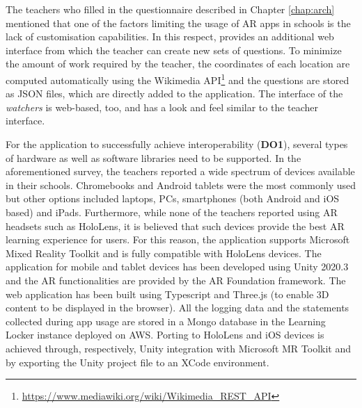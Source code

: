 The teachers who filled in the questionnaire described in Chapter \ref{chap:arch} mentioned that one of the factors limiting the usage of AR apps in schools is the lack of customisation capabilities.
In this respect, \appname{} provides an additional web interface from which the teacher can create new sets of questions.
To minimize the amount of work required by the teacher, the coordinates of each location are computed automatically using the Wikimedia API\footnote{\url{https://www.mediawiki.org/wiki/Wikimedia_REST_API}} and the questions are stored as JSON files, which are directly added to the application.
The interface of the \textit{watchers} is web-based, too, and has a look and feel similar to the teacher interface.

For the application to successfully achieve interoperability (\textbf{DO1}), several types of hardware as well as software libraries need to be supported.
In the aforementioned survey, the teachers reported a wide spectrum of devices available in their schools. Chromebooks and Android tablets were the most commonly used but other options included laptops, PCs, smartphones (both Android and iOS based) and iPads.
Furthermore, while none of the teachers reported using AR headsets such as HoloLens, it is believed that such devices provide the best AR learning experience for users. For this reason, the application supports Microsoft Mixed Reality Toolkit and is fully compatible with HoloLens devices.
The application for mobile and tablet devices has been developed using Unity 2020.3 and the AR functionalities are provided by the AR Foundation framework.
The web application has been built using Typescript and Three.js (to enable 3D content to be displayed in the browser). All the logging data and the statements collected during app usage are stored in a Mongo database in the Learning Locker instance deployed on AWS.
Porting to HoloLens and iOS devices is achieved through, respectively,  Unity integration with Microsoft MR Toolkit and by exporting the Unity project file to an XCode environment.


